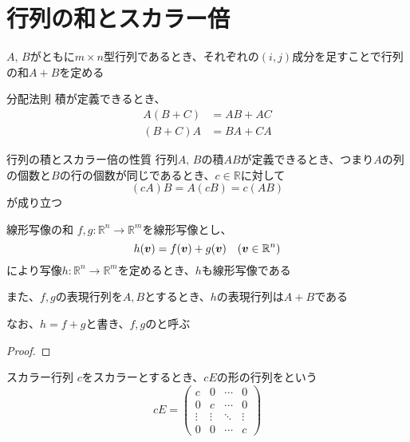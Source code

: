 \documentclass[../../../topic_linear-map]{subfiles}
\begin{document}
\br


\sectionline
\section{行列の和とスカラー倍}

$A, \, B$がともに$m \times n$型行列であるとき、それぞれの$(i, j)$成分を足すことで行列の和$A + B$を定める

\begin{theorem}{分配法則}
  積が定義できるとき、
  \begin{align*}
    A(B + C) & = AB + AC \\
    (B + C)A & = BA + CA
  \end{align*}
\end{theorem}

\begin{theorem}{行列の積とスカラー倍の性質}
  行列$A,\,B$の積$AB$が定義できるとき、つまり$A$の列の個数と$B$の行の個数が同じであるとき、$c \in \mathbb{R}$に対して
  \begin{equation*}
    (cA)B = A(cB) = c(AB)
  \end{equation*}
  が成り立つ
\end{theorem}

\sectionline

\begin{theorem}{線形写像の和}
  $f,g\colon \mathbb{R}^n \to \mathbb{R}^m$を線形写像とし、
  \begin{equation*}
    h(\vb*{v}) = f(\vb*{v}) + g(\vb*{v}) \quad (\vb*{v} \in \mathbb{R}^n)
  \end{equation*}
  により写像$h\colon \mathbb{R}^n \to \mathbb{R}^m$を定めるとき、$h$も線形写像である

  また、$f,g$の表現行列を$A,B$とするとき、$h$の表現行列は$A + B$である

  なお、$h = f + g$と書き、$f,g$のと呼ぶ
\end{theorem}

\begin{proof}
\end{proof}

\sectionline

\begin{definition}{スカラー行列}
  $c$をスカラーとするとき、$cE$の形の行列をという
  \begin{equation*}
    cE = \begin{pmatrix}
      c      & 0      & \cdots & 0      \\
      0      & c      & \cdots & 0      \\
      \vdots & \vdots & \ddots & \vdots \\
      0      & 0      & \cdots & c
    \end{pmatrix}
  \end{equation*}
\end{definition}
\end{document}
